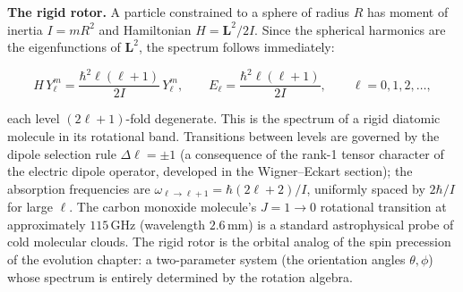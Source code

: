 \medskip\noindent\textbf{The rigid rotor.}
A particle constrained to a sphere of radius $R$ has moment of inertia $I = mR^2$ and Hamiltonian $H = \bm L^2/2I$. Since the spherical harmonics are the eigenfunctions of $\bm L^2$, the spectrum follows immediately:
\begin{linenomath}
  \begin{equation}
    H\,Y_\ell^m = \frac{\hbar^2\ell(\ell+1)}{2I}\,Y_\ell^m,
    \qquad
    E_\ell = \frac{\hbar^2\ell(\ell+1)}{2I},
    \qquad
    \ell = 0,1,2,\ldots,
    \label{eq:rigid-rotor}
  \end{equation}
\end{linenomath}
each level $(2\ell+1)$-fold degenerate. This is the spectrum of a rigid diatomic molecule in its rotational band. Transitions between levels are governed by the dipole selection rule $\Delta\ell = \pm1$ (a consequence of the rank-1 tensor character of the electric dipole operator, developed in the Wigner--Eckart section); the absorption frequencies are $\omega_{\ell\to\ell+1} = \hbar(2\ell+2)/I$, uniformly spaced by $2\hbar/I$ for large $\ell$. The carbon monoxide molecule's $J = 1 \to 0$ rotational transition at approximately $115\,\text{GHz}$ (wavelength $2.6\,\text{mm}$) is a standard astrophysical probe of cold molecular clouds. The rigid rotor is the orbital analog of the spin precession of the evolution chapter: a two-parameter system (the orientation angles $\theta,\phi$) whose spectrum is entirely determined by the rotation algebra.

